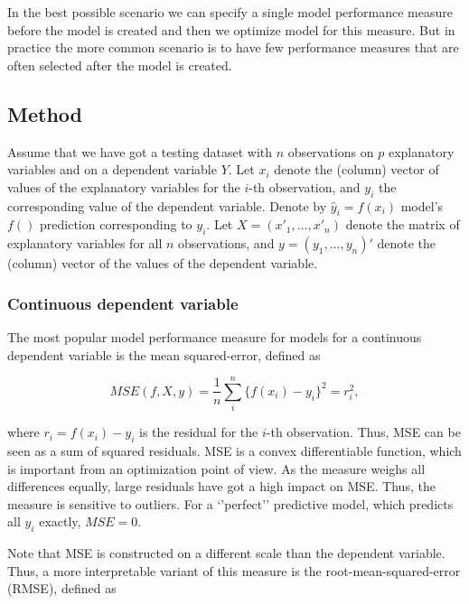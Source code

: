\documentclass[12pt,]{krantz}
\begin{document}
In the best possible scenario we can specify a single model performance measure before the model is created and then we optimize model for this measure. But in practice the more common scenario is to have few performance measures that are often selected after the model is created.

\hypertarget{modelPerformanceMethod}{%
\subsection{Method}\label{modelPerformanceMethod}}

Assume that we have got a testing dataset with \(n\) observations on \(p\) explanatory variables and on a dependent variable \(Y\). Let \(x_i\) denote the (column) vector of values of the explanatory variables for the \(i\)-th observation, and \(y_i\) the corresponding value of the dependent variable. Denote by \(\widehat{y}_i=f(x_i)\) model's \(f()\) prediction corresponding to \(y_i\). Let \(X=(x'_1,\ldots,x'_n)\) denote the matrix of explanatory variables for all \(n\) observations, and \(y=(y_1,\ldots,y_n)'\) denote the (column) vector of the values of the dependent variable.

\hypertarget{modelPerformanceMethodCont}{%
\subsubsection{Continuous dependent variable}\label{modelPerformanceMethodCont}}

The most popular model performance measure for models for a continuous dependent variable is the mean squared-error, defined as

\begin{equation}
MSE(f,X,y) = \frac{1}{n} \sum_{i}^{n} \{f(x_i) - y_i\}^2 = r_i^2,
\label{eq:MSE}
\end{equation}

where \(r_i=f(x_i) - y_i\) is the residual for the \(i\)-th observation. Thus, MSE can be seen as a sum of squared residuals. MSE is a convex differentiable function, which is important from an optimization point of view. As the measure weighs all differences equally, large residuals have got a high impact on MSE. Thus, the measure is sensitive to outliers. For a `'perfect'' predictive model, which predicts all \(y_i\) exactly, \(MSE = 0\).

Note that MSE is constructed on a different scale than the dependent variable. Thus, a more interpretable variant of this measure is the root-mean-squared-error (RMSE), defined as
\end{document}

